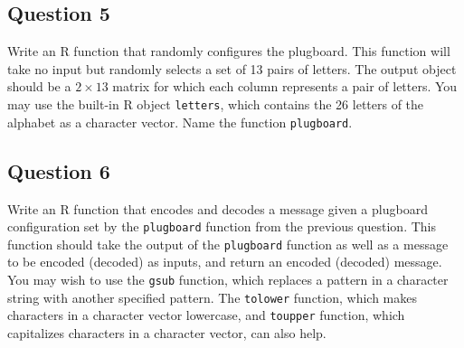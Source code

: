 \documentclass[]{article}
\begin{document}
\subsection{Question 5}\label{question-5}

Write an R function that randomly configures the plugboard. This
function will take no input but randomly selects a set of 13 pairs of
letters. The output object should be a $2 \times 13$ matrix for which
each column represents a pair of letters. You may use the built-in R
object \texttt{letters}, which contains the 26 letters of the alphabet
as a character vector. Name the function \texttt{plugboard}.

\subsection{Question 6}\label{question-6}

Write an R function that encodes and decodes a message given a plugboard
configuration set by the \texttt{plugboard} function from the previous
question. This function should take the output of the \texttt{plugboard}
function as well as a message to be encoded (decoded) as inputs, and
return an encoded (decoded) message. You may wish to use the
\texttt{gsub} function, which replaces a pattern in a character string
with another specified pattern. The \texttt{tolower} function, which
makes characters in a character vector lowercase, and \texttt{toupper}
function, which capitalizes characters in a character vector, can also
help.
\end{document}
